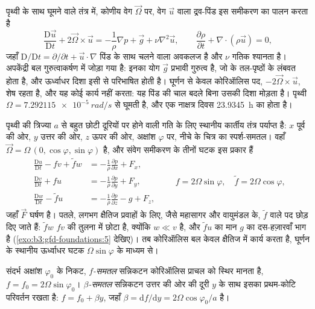 पृथ्वी के साथ घूमने वाले तंत्र में, कोणीय वेग
$\vec\Omega$ पर, वेग $\vec u$ वाला द्रव-पिंड इस समीकरण का पालन करता है
\[
\frac{\mathrm D\vec u}{\mathrm Dt} + 2\vec\Omega\times\vec u =
-\frac{1}{\rho}\nabla p + \vec g + \nu\nabla^2\vec u ,
\qquad
\frac{\partial\rho}{\partial t} + \nabla\cdot(\rho\vec u) = 0 ,
\]
जहाँ $\mathrm D/\mathrm Dt = \partial/\partial t + \vec u\cdot\nabla$
पिंड के साथ चलने वाला अवकलज है और $\nu$ गतिक श्यानता है। अपकेंद्री
बल गुरुत्वाकर्षण में जोड़ा गया है: इनका योग $\vec g$ प्रभावी गुरुत्व है,
जो  के तल-पृष्ठों के लंबवत होता है, और ऊर्ध्वाधर दिशा इसी से परिभाषित होती है।
घूर्णन से केवल कोरिऑलिस पद, $-2\vec\Omega\times
\vec u$, शेष रहता है, और यह कोई कार्य नहीं करता: यह पिंड की चाल बदले बिना उसकी दिशा मोड़ता है।
पृथ्वी $\Omega =
\qty{7.292115e-5}{rad/s}$ से घूमती है, और एक नाक्षत्र दिवस \qty{23.9345}{h} का होता है।

पृथ्वी की त्रिज्या $a$ से बहुत छोटी दूरियों पर होने वाली गति के लिए
स्थानीय कार्तीय तंत्र पर्याप्त है: $x$ पूर्व की ओर, $y$ उत्तर की ओर, $z$ ऊपर की ओर,
अक्षांश $\varphi$ पर, नीचे के चित्र का स्पर्श-समतल। वहाँ
$\vec\Omega = \Omega\,(0, \cos\varphi, \sin\varphi)$ है, और संवेग समीकरण के तीनों
घटक इस प्रकार हैं
\[
\begin{aligned}
\frac{\mathrm Du}{\mathrm Dt} - f v + \tilde f w &= -\frac{1}{\rho}\frac{\partial p}{\partial x} + F_x ,\\
\frac{\mathrm Dv}{\mathrm Dt} + f u &= -\frac{1}{\rho}\frac{\partial p}{\partial y} + F_y ,\\
\frac{\mathrm Dw}{\mathrm Dt} - \tilde f u &= -\frac{1}{\rho}\frac{\partial p}{\partial z} - g + F_z ,
\end{aligned}
\qquad f = 2\Omega\sin\varphi,\quad \tilde f = 2\Omega\cos\varphi ,
\]
जहाँ $\vec F$ घर्षण है। पतले, लगभग क्षैतिज प्रवाहों के लिए, जैसे
महासागर और वायुमंडल के, $\tilde f$ वाले पद छोड़ दिए जाते हैं: $\tilde f w$
$fv$ की तुलना में छोटा है, क्योंकि $w \ll v$ है, और $\tilde f u$ का मान
$g$ का दस-हज़ारवाँ भाग है (\cref{exo:b3:gfd-foundations:5} देखिए)। तब कोरिऑलिस बल केवल
क्षैतिज में कार्य करता है, घूर्णन के स्थानीय ऊर्ध्वाधर घटक
$\Omega\sin\varphi$ के माध्यम से।

\begin{definition}\label{def:b3:gfd-foundations:planes}
संदर्भ अक्षांश $\varphi_0$ के निकट, \emph{$f$-समतल}
सन्निकटन कोरिऑलिस प्राचल को स्थिर मानता है, $f = f_0 =
2\Omega\sin\varphi_0$। \emph{$\beta$-समतल}
सन्निकटन उत्तर की ओर की दूरी $y$ के साथ इसका प्रथम-कोटि परिवर्तन रखता है:
$f = f_0 + \beta y$, जहाँ $\beta = \mathrm df/\mathrm dy = 2\Omega
\cos\varphi_0/a$ है।
\end{definition}

